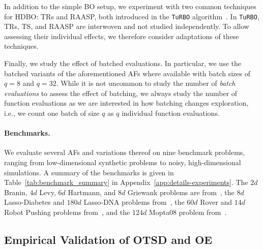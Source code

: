 \documentclass[accepted]{uai2025}
\begin{document}
In addition to the simple \ac{BO} setup, we experiment with two common techniques for \ac{HDBO}: \acp{TR} and \ac{RAASP}, both introduced in the \texttt{TuRBO} algorithm~\citep{eriksson2019scalable}.
In \texttt{TuRBO}, \acp{TR}, \ac{TS}, and \ac{RAASP} are interwoven and not studied independently.
To allow assessing their individual effects, we therefore consider adaptations of these techniques.



Finally, we study the effect of batched evaluations.
In particular, we use the batched variants of the aforementioned \acp{AF} where available with batch sizes of $q=8$ and $q=32$.
While it is not uncommon to study the number of \emph{batch evaluations} to assess the effect of batching, we always study the number of function evaluations as we are interested in how batching changes exploration, i.e., we count one batch of size $q$ as $q$ individual function evaluations.

\paragraph{Benchmarks.}

We evaluate several \acp{AF} and variations thereof on nine benchmark problems, ranging from low-dimensional synthetic problems to noisy, high-dimensional simulations.
A summary of the benchmarks is given in Table~\ref{tab:benchmark_summary} in Appendix~\ref{app:details-experiments}.
The $2d$ Branin, $4d$ Levy, $6d$ Hartmann, and $8d$ Griewank problems are from~\citet{SFU_benchmarks}, the $8d$ Lasso-Diabetes and $180d$ Lasso-DNA problems from~\citet{vsehic2022lassobench}, the $60d$ Rover and $14d$ Robot Pushing problems from~\citet{wang2018batched}, and the $124d$ Mopta08 problem from~\citet{eriksson2021high}.

\subsection{Empirical Validation of OTSD and OE}
\end{document}
